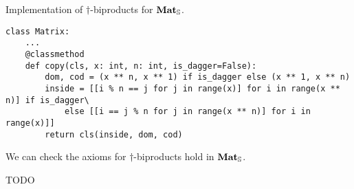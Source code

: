 \begin{python}
{\normalfont Implementation of $\dagger$-biproducts for $\mathbf{Mat}_\S$.}

\begin{verbatim}
class Matrix:
    ...
    @classmethod
    def copy(cls, x: int, n: int, is_dagger=False):
        dom, cod = (x ** n, x ** 1) if is_dagger else (x ** 1, x ** n)
        inside = [[i % n == j for j in range(x)] for i in range(x ** n)] if is_dagger\
            else [[i == j % n for j in range(x ** n)] for i in range(x)]]
        return cls(inside, dom, cod)
\end{verbatim}
\end{python}

\begin{example}
We can check the axioms for $\dagger$-biproducts hold in $\mathbf{Mat}_\S$.

TODO
\end{example}

